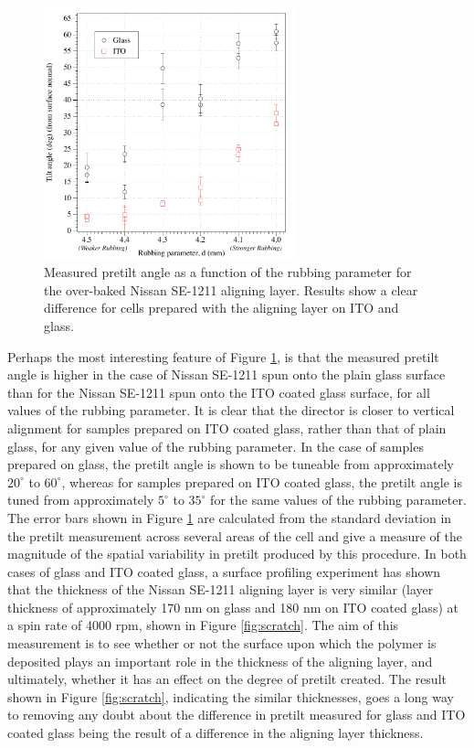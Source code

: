 \begin{figure}
\begin{center}
\includegraphics[width=0.65\textwidth]{Figures/Pretilt/ito_glass}
\end{center}
\caption[Pretilt angle as a function of rubbing parameter for glass and ITO surfaces]{\label{fig:ito_glass}{Measured pretilt angle as a function of the rubbing parameter for the over-baked Nissan SE-1211 aligning layer. Results show a clear difference for cells prepared with the aligning layer on ITO and glass.}}
\end{figure}

Perhaps the most interesting feature of Figure \ref{fig:ito_glass}, is that the measured pretilt angle is higher in the case of Nissan SE-1211 spun onto the plain glass surface than for the Nissan SE-1211 spun onto the ITO coated glass surface, for all values of the rubbing parameter. It is clear that the director is closer to vertical alignment for samples prepared on ITO coated glass, rather than that of plain glass, for any given value of the rubbing parameter. In the case of samples prepared on glass, the pretilt angle is shown to be tuneable from approximately $20^{\circ}$ to $60^{\circ}$, whereas for samples prepared on ITO coated glass, the pretilt angle is tuned from approximately $5^{\circ}$ to $35^{\circ}$ for the same values of the rubbing parameter. The error bars shown in Figure \ref{fig:ito_glass} are calculated from the standard deviation in the pretilt measurement across several areas of the cell and give a measure of the magnitude of the spatial variability in pretilt produced by this procedure. In both cases of glass and ITO coated glass, a surface profiling experiment has shown that the thickness of the Nissan SE-1211 aligning layer is very similar (layer thickness of approximately 170 nm on glass and 180 nm on ITO coated glass) at a spin rate of 4000 rpm, shown in Figure \ref{fig:scratch}. The aim of this measurement is to see whether or not the surface upon which the polymer is deposited plays an important role in the thickness of the aligning layer, and ultimately, whether it has an effect on the degree of pretilt created. The result shown in Figure \ref{fig:scratch}, indicating the similar thicknesses, goes a long way to removing any doubt about the difference in pretilt measured for glass and ITO coated glass being the result of a difference in the aligning layer thickness. 

